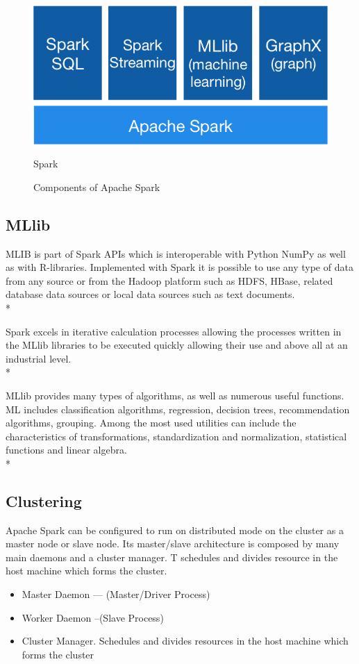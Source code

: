 \begin{figure}[h]
	\centering
	\includegraphics[scale=0.65]{figs/spark-components.png}
	\caption{Components of Apache Spark}Spark
	\label{fig:components-spark}
\end{figure}

\subsection{MLlib}

MLIB is part of Spark APIs which is interoperable with Python NumPy as well as with R-libraries. Implemented with Spark it is possible to use any type of data from any source or from the Hadoop platform such as HDFS, HBase, related database data sources or local data sources such as text documents.\\*

Spark excels in iterative calculation processes allowing the processes written in the MLlib libraries to be executed quickly allowing their use and above all at an industrial level.\\*

MLlib provides many types of algorithms, as well as numerous useful functions. ML includes classification algorithms, regression, decision trees, recommendation algorithms, grouping. Among the most used utilities can include the characteristics of transformations, standardization and normalization, statistical functions and linear algebra.\\*

\subsection{Clustering}



Apache Spark can be configured to run on distributed mode on the cluster as a master node or slave node. Its master/slave architecture is composed by many main daemons and a cluster manager. T schedules and divides resource in the host machine which forms the cluster. 
\begin{itemize}

	\item Master Daemon — (Master/Driver Process)
	\item Worker Daemon –(Slave Process)
	\item Cluster Manager. Schedules and divides resources in the host machine which forms the cluster
\end{itemize}

